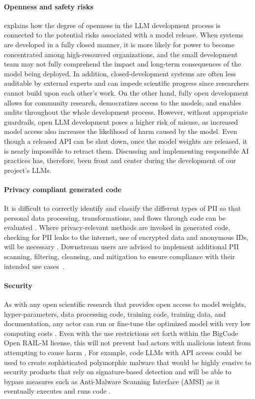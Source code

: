 \documentclass[10pt]{article} %
\begin{document}
\paragraph{Openness and safety risks} \citet{solaiman2023gradient} explains how the degree of openness in the LLM development process is connected to the potential risks associated with a model release. When systems are developed in a fully closed manner, it is more likely for power to become concentrated among high-resourced organizations, and the small development team may not fully comprehend the impact and long-term consequences of the model being deployed. In addition, closed-development systems are often less auditable by external experts and can impede scientific progress since researchers cannot build upon each other’s work. On the other hand, fully open development allows for community research, democratizes access to the models, and enables audits throughout the whole development process. However, without appropriate guardrails, open LLM development poses a higher risk of misuse, as increased model access also increases the likelihood of harm caused by the model. Even though a released API can be shut down, once the model weights are released, it is nearly impossible to retract them. Discussing and implementing responsible AI practices has, therefore, been front and center during the development of our project’s LLMs.

\paragraph{Privacy compliant generated code} It is difficult to correctly identify and classify the different types of PII so that personal data processing, transformations, and flows through code can be evaluated \citep{tang2023PII}. Where privacy-relevant methods are invoked in generated code, checking for PII leaks to the internet, use of encrypted data and anonymous IDs, will be necessary \citep{tang2024privacy}. Downstream users are advised to implement additional PII scanning, filtering, cleansing, and mitigation to ensure compliance with their intended use cases~\citep{yang2023gotcha,albalak2024survey}.

\paragraph{Security} As with any open scientific research that provides open access to model weights, hyper-parameters, data processing code, training code, training data, and documentation, any actor can run or fine-tune the optimized model with very low computing costs \citep{governanceai2024opensourcing}. Even with the use restrictions set forth within the BigCode Open RAIL-M license, this will not prevent bad actors with malicious intent from attempting to cause harm \citep{mozes2023use}. For example, code LLMs with API access could be used to create sophisticated polymorphic malware \citep{crowdstrike2024polymorphicvirus} that would be highly evasive to security products that rely on signature-based detection and will be able to bypass measures such as Anti-Malware Scanning Interface (AMSI) as it eventually executes and runs code \citep{cyberark2024chatting, gupta2023malware}.
\end{document}

